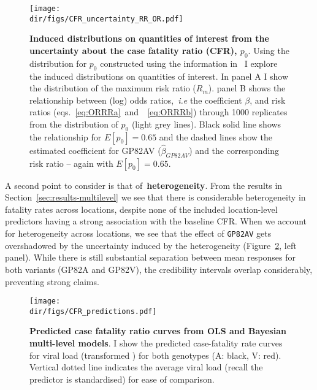\begin{figure}[!ht]
  \centering
  \texttt{[image: \\dir/figs/CFR\_uncertainty\_RR\_OR.pdf]}
\caption[Induced distributions on quantities of interest from the uncertainty about the case fatality ratio.]{\textbf{Induced distributions on quantities of interest from the uncertainty about the case fatality ratio (CFR), $p_0$}.
Using the distribution for $p_0$ constructed using the information in~\cite{Nyakarahuka2016} I explore the induced distributions on quantities of interest.  
In panel A I show the distribution of the maximum risk ratio ($R_m$).
panel B shows the relationship between (log) odds ratios,~\textit{i.e} the coefficient $\beta$, and risk ratios (eqs.~\ref{eq:ORRRa}~and~~\ref{eq:ORRRb}) through 1000 replicates from the distribution of $p_0$ (light grey lines).
Black solid line shows the relationship for $E[p_0] = 0.65$ and the dashed lines show the estimated coefficient for GP82AV ($\hat{\beta}_{GP82AV}$) and the corresponding risk ratio -- again with $E[p_0] = 0.65$.
}
\label{fig:ORRRuncertainty}
\end{figure}

A second point to consider is that of~\textbf{heterogeneity}.
From the results in Section~\ref{sec:results-multilevel} we see that there is considerable heterogeneity in fatality rates across locations, despite none of the included location-level predictors having a strong association with the baseline CFR.
When we account for heterogeneity across locations, we see that the effect of \verb|GP82AV| gets overshadowed by the uncertainty induced by the heterogeneity (Figure~\ref{fig:CFRpred}, left panel).
While there is still substantial separation between mean responses for both variants (GP82A and GP82V), the credibility intervals overlap considerably, preventing strong claims.

\begin{figure}[!ht]
  \centering
  \texttt{[image: \\dir/figs/CFR\_predictions.pdf]}
\caption[Predicted case fatality ratio curves from OLS and Bayesian multi-level models.]{\textbf{Predicted case fatality ratio curves from OLS and Bayesian multi-level models}.
I show the predicted case-fatality rate curves for viral load (transformed \ct) for both genotypes (A: black, V: red). 
Vertical dotted line indicates the average viral load (recall the predictor is standardised) for ease of comparison.
}
\label{fig:CFRpred}
\end{figure}

